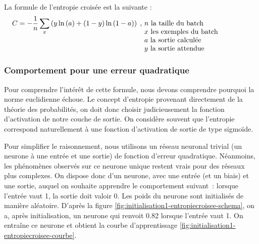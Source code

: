 La formule de l'entropie croisée est la suivante : 
\begin{equation}
 C = -\frac{1}{n}\sum_x\left(y\ln\left(a\right) + \left(1-y\right)\ln\left(1-a\right)\right)\; \text{, \parbox[t]{15em}{$n$ la taille du batch\\ $x$ les exemples du batch\\
 $a$ la sortie calculée\\$y$ la sortie attendue}}
 \label{eq:formule-entropiecroisee}
\end{equation}

\subsubsection{Comportement pour une erreur quadratique}

Pour comprendre l'intérêt de cette formule, nous devons comprendre pourquoi la norme euclidienne échoue. Le concept d'entropie provenant 
directement de la théorie des probabilités, on doit donc choisir judicieusement la fonction d'activation de notre couche de sortie. On 
considère souvent que l'entropie correspond naturellement à une fonction d'activation de sortie de type sigmoïde. 

Pour simplifier le raisonnement, nous utilisons un réseau neuronal trivial (un neurone à une entrée et une sortie) de fonction d'erreur quadratique. 
Néanmoins, les phénomènes observés sur ce neurone unique restent vrais pour des réseaux plus complexes. On dispose donc d'un neurone, avec une entrée (et un biais) et 
une sortie, auquel on souhaite apprendre le comportement suivant~: lorsque l'entrée vaut 1, la sortie doit valoir 0.
Les poids du neurone sont initialisés de manière aléatoire. D'après la figure \ref{fig:initialisation1-entropiecroisee-schema}, on a, après initialisation,
un neurone qui renvoit 0.82 lorsque l'entrée vaut 1. On entraîne ce neurone et obtient la courbe d'apprentissage 
\ref{fig:initialisation1-entropiecroisee-courbe}.



